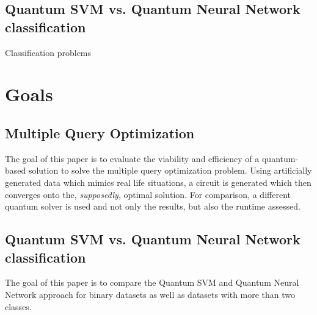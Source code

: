 \subsection{Quantum SVM vs. Quantum Neural Network classification}
Classification problems

\section{Goals}

\subsection{Multiple Query Optimization}
The goal of this paper is to evaluate the viability and efficiency of a quantum-based solution to solve the multiple query optimization problem. Using artificially generated data which mimics real life situations, a circuit is generated which then converges onto the, \emph{supposedly}, optimal solution. For comparison, a different quantum solver is used and not only the results, but also the runtime assessed.

\subsection{Quantum SVM vs. Quantum Neural Network classification}
The goal of this paper is to compare the Quantum SVM and Quantum Neural Network approach for binary datasets as well as datasets with more than two classes.

\newpage
